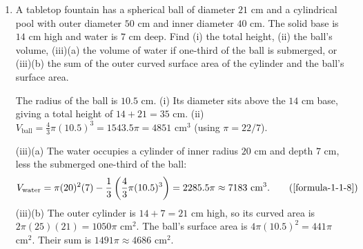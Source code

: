 \begin{enumerate}[label={},font=\normalfont,leftmargin=1.15cm,labelwidth=1.0cm,labelsep=0.15cm,itemindent=0pt,listparindent=0pt,parsep=0pt,topsep=0pt]
\item[3.1.38] A tabletop fountain has a spherical ball of diameter $21$ cm and a cylindrical pool with outer diameter $50$ cm and inner diameter $40$ cm. The solid base is $14$ cm high and water is $7$ cm deep. Find (i) the total height, (ii) the ball's volume, (iii)(a) the volume of water if one-third of the ball is submerged, or (iii)(b) the sum of the outer curved surface area of the cylinder and the ball's surface area.

\vspace{0.6em}\par\solution


The radius of the ball is $10.5$ cm. (i) Its diameter sits above the $14$ cm base, giving a total height of $14+21=35$ cm. (ii) $V_{\text{ball}}=\frac43\pi(10.5)^3=1543.5\pi=4851$ cm$^3$ (using $\pi=22/7$).

(iii)(a) The water occupies a cylinder of inner radius $20$ cm and depth $7$ cm, less the submerged one-third of the ball:
\begin{equation*}
V_{\text{water}}=\pi(20)^2(7)-\frac13\left(\frac43\pi(10.5)^3\right)=2285.5\pi\approx7183\text{ cm}^3.
\tag*{(\ref{formula-1-1-8})}\end{equation*}
(iii)(b) The outer cylinder is $14+7=21$ cm high, so its curved area is $2\pi(25)(21)=1050\pi$ cm$^2$. The ball's surface area is $4\pi(10.5)^2=441\pi$ cm$^2$. Their sum is $1491\pi\approx4686$ cm$^2$.
\end{enumerate}
